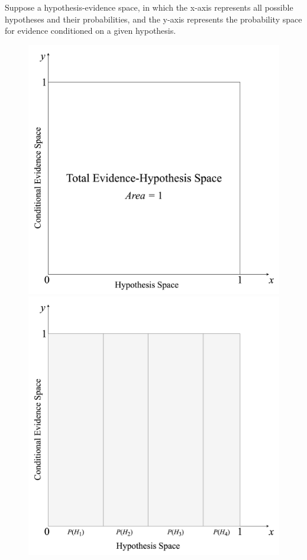 \documentclass[12pt]{article}
\begin{document}
\newpage

\noindent Suppose a hypothesis-evidence space, in which the x-axis represents all possible hypotheses and their probabilities, and the y-axis represents the probability space for evidence conditioned on a given hypothesis.

\begin{figure}[h!]
    \centering
    \begin{minipage}{0.50\textwidth}
        \centering
        \includegraphics[width=\textwidth]{assets/visual_3.png}
    \end{minipage}\hfill
    \begin{minipage}{0.50\textwidth}
        \centering
        \includegraphics[width=\textwidth]{assets/visual_4.png}

\end{minipage}
\end{figure}
\end{document}
